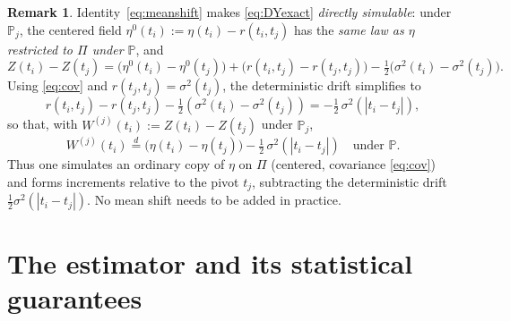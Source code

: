 \documentclass{amsart}
\theoremstyle{definition}
\newtheorem{remark}{Remark}
\newcommand{\PP}{\mathbb{P}}
\begin{document}
\begin{remark}\label{rem:simulable}
Identity~\eqref{eq:meanshift} makes \eqref{eq:DYexact} \emph{directly
simulable}: under $\PP_j$, the centered field $\eta^0(t_i):=\eta(t_i)-r(t_i,t_j)$
has the \emph{same law as $\eta$ restricted to $\Pi$ under $\PP$}, and
\[
  Z(t_i)-Z(t_j)
  =\big(\eta^0(t_i)-\eta^0(t_j)\big)
   +\big(r(t_i,t_j)-r(t_j,t_j)\big)
   -\tfrac12\big(\sigma^2(t_i)-\sigma^2(t_j)\big).
\]
Using \eqref{eq:cov} and $r(t_j,t_j)=\sigma^2(t_j)$, the deterministic drift
simplifies to
\[
  r(t_i,t_j)-r(t_j,t_j)-\tfrac12(\sigma^2(t_i)-\sigma^2(t_j))
  =-\tfrac12\,\sigma^2(|t_i-t_j|),
\]
so that, with $W^{(j)}(t_i):=Z(t_i)-Z(t_j)$ under $\PP_j$,
\begin{equation}\label{eq:Wlaw}
   W^{(j)}(t_i)\stackrel{d}{=}
   \big(\eta(t_i)-\eta(t_j)\big)-\tfrac12\,\sigma^2(|t_i-t_j|)\quad\text{under }\PP.
\end{equation}
Thus one simulates an ordinary copy of $\eta$ on $\Pi$ (centered, covariance
\eqref{eq:cov}) and forms increments relative to the pivot $t_j$, subtracting the
deterministic drift $\tfrac12\sigma^2(|t_i-t_j|)$. No mean shift needs to be added
in practice.
\end{remark}

\section{The estimator and its statistical guarantees}
\end{document}
